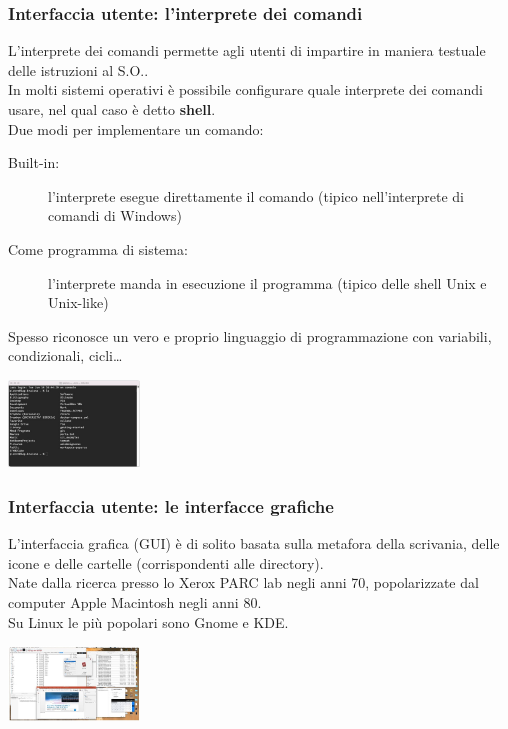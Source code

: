 \subsubsection{Interfaccia utente: l'interprete dei comandi}
L'interprete dei comandi permette agli utenti di impartire in maniera testuale delle istruzioni al S.O..\\
In molti sistemi operativi è possibile configurare quale interprete dei comandi usare, nel qual caso è detto \textbf{shell}.\\
Due modi per implementare un comando:
\begin{description}
    \item[Built-in:] l'interprete esegue direttamente il comando (tipico nell'interprete di comandi di Windows)
    \item[Come programma di sistema:] l'interprete manda in esecuzione il programma (tipico delle shell Unix e Unix-like)
\end{description}
Spesso riconosce un vero e proprio linguaggio di programmazione con variabili, condizionali, cicli\dots
\begin{center}
    \includegraphics[width=35mm]{images/SO/SO_InterfacciaUtente_InterpreteComandi.jpg}
\end{center}

\subsubsection{Interfaccia utente: le interfacce grafiche}
L'interfaccia grafica (GUI) è di solito basata sulla metafora della scrivania, delle icone e delle cartelle (corrispondenti alle directory).\\
Nate dalla ricerca presso lo Xerox PARC lab negli anni 70, popolarizzate dal computer Apple Macintosh negli anni 80.\\
Su Linux le più popolari sono Gnome e KDE.
\begin{center}
    \includegraphics[width=35mm]{images/SO/SO_InterfacciaUtente_InterfacceGrafiche.jpg}
\end{center}

